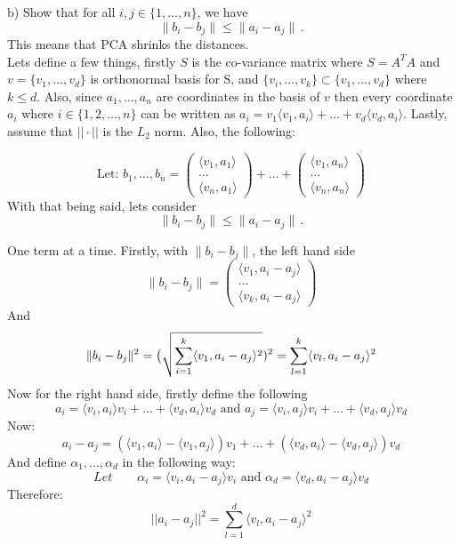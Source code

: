 \documentclass[12pt,twoside]{article}
\begin{document}
b) Show that for all $i,j \in \{1, \dots, n\}$, we have
$$
	\|b_i - b_j\| \leq \|a_i - a_j\| \,.
$$
This means that PCA shrinks the distances.\\

Lets define a few things, firstly $S$ is the co-variance matrix where $S=A^TA$ and $v=\{v_1,\dots,v_d\}$ is orthonormal basis for S, and $\{v_i,\dots,v_k\} \subset \{v_1,\dots,v_d\}$ where $k\leq d$. Also, since $a_1, \dots, a_n$ are coordinates in the basis of $v$ then every coordinate $a_i$ where $i\in \{1,2,\dots,n\}$ can be written as $a_i = v_1\langle v_1, a_i \rangle + \dots + v_d\langle v_d, a_i \rangle$. Lastly, assume that $||\cdot||$ is the $L_2$ norm. Also, the following:

$$
    \text{Let: } b_1, \dots, b_n = \begin{pmatrix} \langle v_1,a_1 \rangle \\ \dots \\ \langle v_n, a_1\rangle \end{pmatrix} + \dots + \begin{pmatrix} \langle v_1,a_n \rangle \\ \dots \\ \langle v_n, a_n\rangle \end{pmatrix}
$$
With that being said, lets consider 
$$
	\|b_i - b_j\| \leq \|a_i - a_j\| \,.
$$

One term at a time. Firstly, with $\|b_i - b_j\|$, the left hand side
$$
    \|b_i - b_j\| = \begin{pmatrix}
    \langle v_1, a_i - a_j \rangle \\
    \dots \\
    \langle v_k, a_i-a_j \rangle
    \end{pmatrix}
$$
And
$$
    \|b_i - b_j\|^2 = \big{(} \sqrt{\sum_{i=1}^k \langle v_1, a_i - a_j \rangle^2})^2 = \sum_{l=1}^k \langle v_l, a_i-a_j\rangle^2
$$
Now for the right hand side, firstly define the following
$$
    a_i = \langle v_i, a_i \rangle v_i + \dots + \langle v_d, a_i \rangle v_d \text{ and } a_j = \langle v_i, a_j \rangle v_i + \dots + \langle v_d, a_j \rangle v_d 
$$
Now:
$$
    a_i - a_j = (\langle v_1, a_i \rangle - \langle v_1,a_j \rangle) v_1 + \dots + (\langle v_d, a_i \rangle - \langle v_d, a_j \rangle)v_d
$$
And define $\alpha_1, \dots, \alpha_d$ in the following way:
$$
    Let \qquad \alpha_i = \langle v_i, a_i - a_j \rangle v_i \text{ and } \alpha_d = \langle v_d, a_i - a_j \rangle v_d
$$
Therefore:
$$
    ||a_i - a_j || ^2 = \sum_{l=1}^d \langle v_l, a_i-a_j \rangle^2
$$
\end{document}
